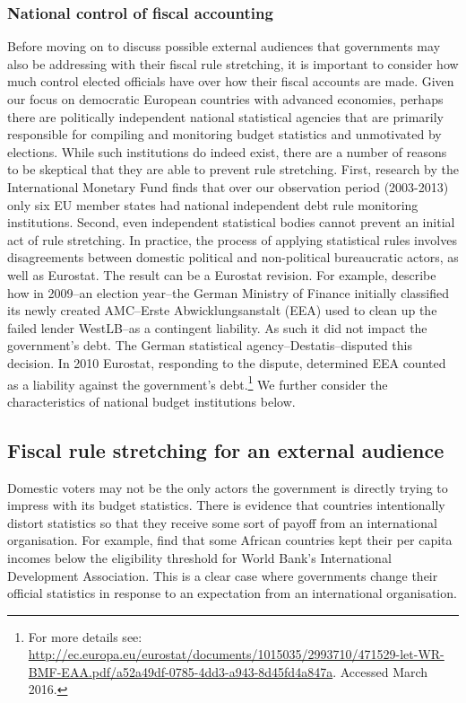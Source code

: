 \documentclass[]{article}
\begin{document}
\subsubsection{National control of fiscal accounting}

Before moving on to discuss possible external audiences that governments may also be addressing with their fiscal rule stretching, it is important to consider how much control elected officials have over how their fiscal accounts are made. Given our focus on democratic European countries with advanced economies, perhaps there are politically independent national statistical agencies that are primarily responsible for compiling and monitoring budget statistics and unmotivated by elections. While such institutions do indeed exist, there are a number of reasons to be skeptical that they are able to  prevent rule stretching. First, research by the International Monetary Fund \citep{bova2015rules} finds that over our observation period (2003-2013) only six EU member states had national independent debt rule monitoring institutions. Second, even independent statistical bodies cannot prevent an initial act of rule stretching. In practice, the process of applying statistical rules involves disagreements between domestic political and non-political bureaucratic actors, as well as Eurostat. The result can be a Eurostat revision. For example, \cite{GandrudHallerberg2016} describe how in 2009--an election year--the German Ministry of Finance initially classified its newly created AMC--Erste Abwicklungsanstalt (EEA) used to clean up the failed lender WestLB--as a contingent liability. As such it did not impact the government's debt. The German statistical agency--Destatis--disputed this decision. In 2010 Eurostat, responding to the dispute, determined EEA counted as a liability against the government's debt.\footnote{For more details see: \url{http://ec.europa.eu/eurostat/documents/1015035/2993710/471529-let-WR-BMF-EAA.pdf/a52a49df-0785-4dd3-a943-8d45fd4a847a}. Accessed March 2016.} We further consider the characteristics of national budget institutions below.

\subsection{Fiscal rule stretching for an external audience}

Domestic voters may not be the only actors the government is directly trying to impress with its budget statistics. There is evidence that countries intentionally distort statistics so that they receive some sort of payoff from an international organisation. For example, \cite{kerner2016} find that some African countries kept their per capita incomes below the eligibility threshold for World Bank’s International Development Association. This is a clear case where governments change their official statistics in response to an expectation from an international organisation.
\end{document}
